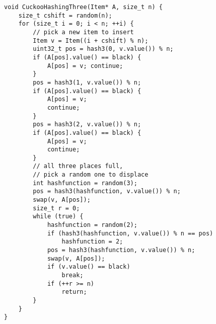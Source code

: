 \documentclass[a4paper,landscape,12pt,twoside,english]{scrartcl}
\begin{document}
\clearpage
{}
\recalctypearea
\fontsize{16}{18.1}\selectfont
\begin{verbatim}
void CuckooHashingThree(Item* A, size_t n) {
    size_t cshift = random(n);
    for (size_t i = 0; i < n; ++i) {
        // pick a new item to insert
        Item v = Item((i + cshift) % n);
        uint32_t pos = hash3(0, v.value()) % n;
        if (A[pos].value() == black) {
            A[pos] = v; continue;
        }
        pos = hash3(1, v.value()) % n;
        if (A[pos].value() == black) {
            A[pos] = v;
            continue;
        }
        pos = hash3(2, v.value()) % n;
        if (A[pos].value() == black) {
            A[pos] = v;
            continue;
        }
        // all three places full,
        // pick a random one to displace
        int hashfunction = random(3);
        pos = hash3(hashfunction, v.value()) % n;
        swap(v, A[pos]);
        size_t r = 0;
        while (true) {
            hashfunction = random(2);
            if (hash3(hashfunction, v.value()) % n == pos)
                hashfunction = 2;
            pos = hash3(hashfunction, v.value()) % n;
            swap(v, A[pos]);
            if (v.value() == black)
                break;
            if (++r >= n)
                return;
        }
    }
}
\end{verbatim}
\end{document}
